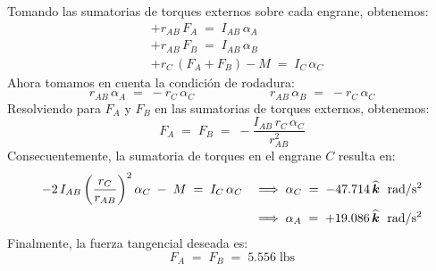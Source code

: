 \documentclass[ a4paper, twoside, 11pt]{article}
\begin{document}
\begin{problem}
Tomando las sumatorias de torques externos sobre cada engrane, obtenemos:
\begin{align*}
& +r_{AB} \, F_A \; = \; I_{AB} \, \alpha_A \\
& +r_{AB} \, F_B \; = \; I_{AB} \, \alpha_B \\
& + r_C \, ( F_A + F_B ) - M \; = \; I_C \, \alpha_C
\end{align*}
Ahora tomamos en cuenta la condici\'on de rodadura: 
\[
r_{AB} \, \alpha_A \; = \; -r_C \, \alpha_C \qquad \qquad \qquad
r_{AB} \, \alpha_B \; = \; -r_C \, \alpha_C
\]
Resolviendo para $F_A$ y $F_B$ en las sumatorias de torques externos, obtenemos: 
\[
F_A \; = \; F_B \; = \; -\frac{ I_{AB} \, r_C \, \alpha_C }{r_{AB}^2}
\]
Consecuentemente, la sumatoria de torques en el engrane $C$ resulta en:
\begin{align*}
-2 \, I_{AB} \left( \frac{r_C}{r_{AB}} \right)^2 \alpha_C \; - \; M
\; = \; I_C \, \alpha_C \quad
& \Longrightarrow \;
\alpha_C \; = \; -47.714 \, {\boldsymbol{\widehat{k}}} \; \text{ rad/s\ensuremath{^{\text{2}}}} \\
& \Longrightarrow \;
\alpha_A \; = \; +19.086 \, {\boldsymbol{\widehat{k}}} \; \text{ rad/s\ensuremath{^{\text{2}}}}
\end{align*}
Finalmente, la fuerza tangencial deseada es: 
\[
F_A \; = \; F_B \; = \; 5.556 \; \text{lbs}
\]
\QED

\end{problem}
\fullskip
\end{document}
